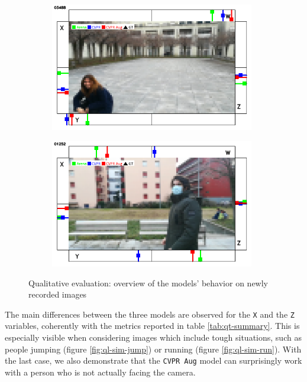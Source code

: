 \begin{figure}[H]
\begin{center}
\begin{subfigure}[h]{0.49\textwidth}
		\end{subfigure}
		\vfill
		\begin{subfigure}[h]{0.49\textwidth}
			\centering
			\includegraphics[width=0.98\textwidth]{"contents/images/qualitative-videos/perfect4-square01-3488"}
		\end{subfigure}
		\hfill
		\begin{subfigure}[h]{0.49\textwidth}
			\centering
			\includegraphics[width=0.98\textwidth]{"contents/images/qualitative-videos/perfect5-square02-1252"}
		\end{subfigure}
		\vfill
	\end{center}
	\vspace{-0.5cm}
	\caption[Qualitative evaluation: overview of the models' behavior on newly recorded images]{Qualitative evaluation: overview of the models' behavior on newly recorded images}
	\label{fig:ql-sim-intro}
\end{figure}

The main differences between the three models are observed for the \texttt{X} and the \texttt{Z} variables, coherently with the metrics reported in table \ref{tab:qt-summary}. This is especially visible when considering images which include tough situations, such as people jumping (figure \ref{fig:ql-sim-jump}) or running (figure \ref{fig:ql-sim-run}). With the last case, we also demonstrate that the \texttt{CVPR Aug} model can surprisingly work with a person who is not actually facing the camera.


